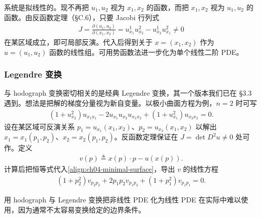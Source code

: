 \documentclass[../../main.tex]{subfiles}
\begin{document}
系统是拟线性的。现不再把 $u_1,u_2$ 视为 $x_1,x_2$ 的函数，而把 $x_1,x_2$ 视为 $u_1,u_2$ 的函数。由反函数定理（\S C.6），只要 Jacobi 行列式
\begin{align*}
J=\frac{\partial(u_1,u_2)}{\partial(x_1,x_2)}=u_{x_1}^1u_{x_2}^2-u_{x_2}^1u_{x_1}^2\neq 0
\end{align*}
在某区域成立，即可局部反演。代入后得到关于 $x=(x_1,x_2)$ 作为 $u=(u_1,u_2)$ 函数的线性组。可用势函数法进一步化为单个线性二阶 PDE。

\subsubsection{Legendre 变换}

与 hodograph 变换密切相关的是经典 Legendre 变换，其一个版本我们已在 \S3.3 遇到。想法是把解的梯度分量视为新自变量。以极小曲面方程为例，$n=2$ 时可写
\begin{align}\label{align:ch04-minimal-surface}
(1+u_{x_2}^2)u_{x_1x_1}-2u_{x_1}u_{x_2}u_{x_1x_2}+(1+u_{x_1}^2)u_{x_2x_2}=0.
\end{align}
设在某区域可反演关系 $p_1=u_{x_1}(x_1,x_2)$、$p_2=u_{x_2}(x_1,x_2)$ 以解出 $x_1=x_1(p_1,p_2)$、$x_2=x_2(p_1,p_2)$。反函数定理保证在 $J=\det D^2u\neq 0$ 处可作。定义
\begin{align}\label{align:ch04-legendre}
v(p)\triangleq x(p)\cdot p-u(x(p)).
\end{align}
计算后把恒等式代入\eqref{align:ch04-minimal-surface}，导出 $v$ 的线性方程
\begin{align}\label{align:ch04-legendre-linear}
(1+p_2^2)v_{p_2p_2}+2p_1p_2v_{p_1p_2}+(1+p_1^2)v_{p_1p_1}=0.
\end{align}

\begin{remark}\label{remark:ch04-hodograph}
用 hodograph 与 Legendre 变换把非线性 PDE 化为线性 PDE 在实际中难以使用，因为通常不太容易变换给定的边界条件。
\end{remark}
\end{document}

